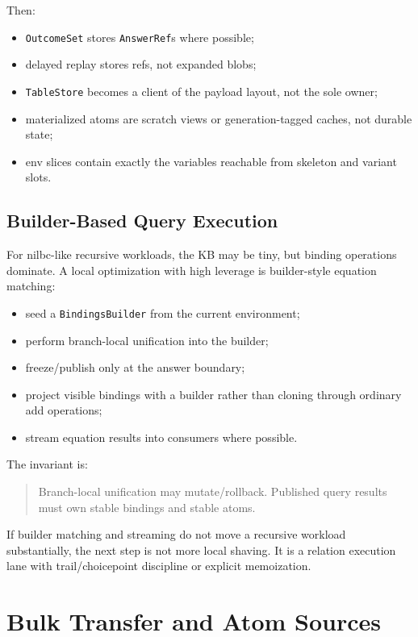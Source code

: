 \documentclass[11pt]{article}
\newcommand{\AnswerRef}{\texttt{AnswerRef}}
\begin{document}
Then:

\begin{itemize}[leftmargin=*]
  \item \texttt{OutcomeSet} stores \AnswerRef{}s where possible;
  \item delayed replay stores refs, not expanded blobs;
  \item \texttt{TableStore} becomes a client of the payload layout, not the sole owner;
  \item materialized atoms are scratch views or generation-tagged caches, not durable state;
  \item env slices contain exactly the variables reachable from skeleton and variant slots.
\end{itemize}

\subsection{Builder-Based Query Execution}

For nilbc-like recursive workloads, the KB may be tiny, but binding operations dominate.  A local optimization with high leverage is builder-style equation matching:

\begin{itemize}[leftmargin=*]
  \item seed a \texttt{BindingsBuilder} from the current environment;
  \item perform branch-local unification into the builder;
  \item freeze/publish only at the answer boundary;
  \item project visible bindings with a builder rather than cloning through ordinary add operations;
  \item stream equation results into consumers where possible.
\end{itemize}

The invariant is:

\begin{quote}
Branch-local unification may mutate/rollback.  Published query results must own stable bindings and stable atoms.
\end{quote}

If builder matching and streaming do not move a recursive workload substantially, the next step is not more local shaving.  It is a relation execution lane with trail/choicepoint discipline or explicit memoization.

\section{Bulk Transfer and Atom Sources}\label{sec:bulk-transfer}
\end{document}
